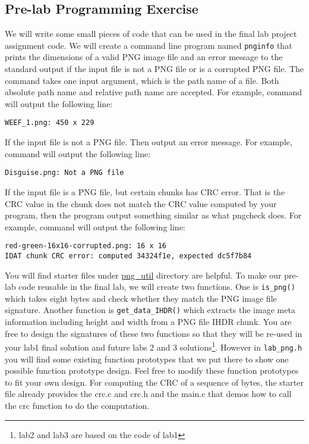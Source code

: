 \subsection{Pre-lab Programming Exercise}
\label{sec:lab1_prelab_assignment}
We will write some small pieces of code that can be used in the final lab project assignment code. We will create a command line program named \verb+pnginfo+ that prints the dimensions of a valid PNG image file and an error message to the standard output if the input file is not a PNG file or is a corrupted PNG file. The command takes one input argument, which is the path name of a file. Both absolute path name and relative path name are accepted. For example, command  will output the following line: 
\begin{verbatim}
WEEF_1.png: 450 x 229 
\end{verbatim}
If the input file is not a PNG file. Then output an error message. For example, command  will output the following line:
\begin{verbatim}
Disguise.png: Not a PNG file 
\end{verbatim}
If the input file is a PNG file, but certain chunks has CRC error. That is the CRC value in the chunk does not match the CRC value computed by your program, then the program output something similar as what pngcheck does. For example, command  will output the following line:
\begin{verbatim}
red-green-16x16-corrupted.png: 16 x 16 
IDAT chunk CRC error: computed 34324f1e, expected dc5f7b84
\end{verbatim}

You will find starter files under \href{http://github.com/yqh/ece252/tree/master/lab1/starter/png_util}{png\_util} directory are helpful. To make our pre-lab code reusable in the final lab, we will create two functions. One is \verb+is_png()+ which takes eight bytes and check whether they match the PNG image file signature. Another function is \verb+get_data_IHDR()+ which extracts the image meta information including height and width from a PNG file IHDR chunk. You are free to design the signatures of these two functions so that they will be re-used in your lab1 final solution and future labs 2 and 3 solutions\footnote{lab2 and lab3 are based on the code of lab1}. However in \verb+lab_png.h+ you will find some existing function prototypes that we put there to show one possible function prototype design. Feel free to modify these function prototypes to fit your own design. For computing the CRC of a sequence of bytes, the starter file already provides the crc.c and crc.h and the main.c that demos how to call the crc function to do the computation.

